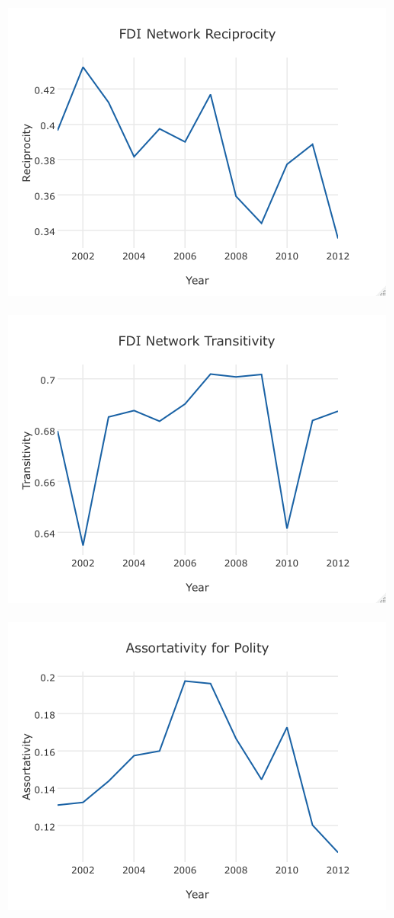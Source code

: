 \documentclass{article}
\begin{document}
\includegraphics[height=8cm,width=10cm]{draft_figures/reciprocity.png}\\
\includegraphics[height=8cm,width=10cm]{draft_figures/transitivity.png}\\
\includegraphics[height=8cm,width=10cm]{draft_figures/assortativity.png}
\end{document}
